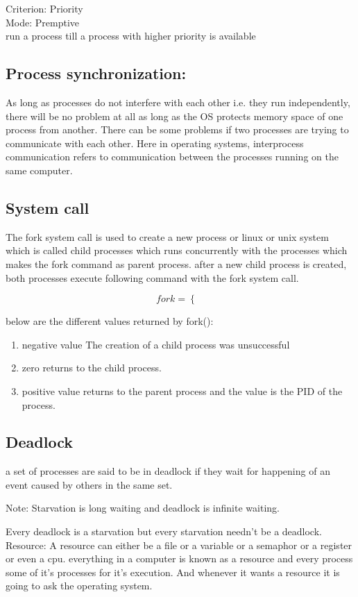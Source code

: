 \documentclass[12pt,letterpaper]{article}
\begin{document}
  Criterion: Priority\\ 
  Mode: Premptive\\ 
  
  run a process till a process with higher priority is available

  \subsection{Process synchronization:}
  As long as processes do not interfere with each other i.e. they run independently, 
  there will be no problem at all as long as the OS protects memory space of one process
  from another. There can be some problems if two processes are trying to communicate 
  with each other. Here in operating systems, interprocess communication refers to 
  communication between the processes running on the same computer. 


  \subsection{System call}
  The fork system call is used to create a new process or linux or unix system which is 
  called child processes which runs concurrently with the processes which makes the 
  fork command as parent process. after a new child process is created, both processes 
  execute following command with the fork system call. 

  \[
    fork = \begin{cases} \end{cases}
  \]

  below are the different values returned by fork(): 
  \begin{enumerate}
    \item negative value
      The creation of a child process was unsuccessful
    \item zero
      returns to the child process. 
    \item positive value
      returns to the parent process and the value is the PID of the process. 
  \end{enumerate}
  \subsection{Deadlock}
  a set of processes are said to be in deadlock if they wait for happening of an 
  event caused by others in the same set. \\
  \begin{mdframed}
    Note: Starvation is long waiting and deadlock is infinite waiting. 
  \end{mdframed}
  Every deadlock is a starvation but every starvation needn't be a deadlock. \\
  Resource: A resource can either be a file or a variable or a semaphor or a register
  or even a cpu.
  everything in a computer is known as a resource and every process some of it's processes 
  for it's execution. And whenever it wants a resource it is going to ask the operating system.
\end{document}
